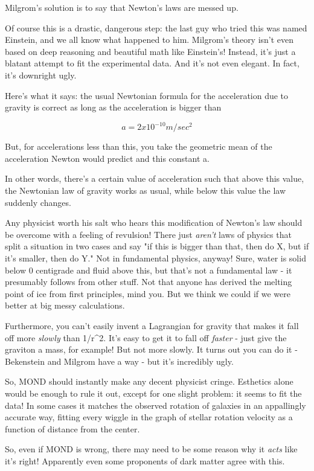 Milgrom's solution is to say that Newton's laws are messed up.

Of course this is a drastic, dangerous step: the last guy who tried this
was named Einstein, and we all know what happened to him.  Milgrom's theory 
isn't even based on deep reasoning and beautiful math like Einstein's!  
Instead, it's just a blatant attempt to fit the experimental data.  
And it's not even elegant.  In fact, it's downright ugly.

Here's what it says: the usual Newtonian formula for the acceleration 
due to gravity is correct as long as the acceleration is bigger than

$$
a = 2 x 10^{-10} m/sec^{2}   
$$
    
But, for accelerations less than this, you take the geometric mean
of the acceleration Newton would predict and this constant a.

In other words, there's a certain value of acceleration such that above
this value, the Newtonian law of gravity works as usual, while below this
value the law suddenly changes.

Any physicist worth his salt who hears this modification of Newton's law
should be overcome with a feeling of revulsion!  There just \emph{aren't} 
laws
of physics that split a situation in two cases and say "if this is bigger
than that, then do X, but if it's smaller, then do Y."  Not in fundamental
physics, anyway!  Sure, water is solid below 0 centigrade and fluid above
this, but that's not a fundamental law - it presumably follows from other 
stuff.  Not that anyone has derived the melting point of ice from first
principles, mind you.  But we think we could if we were better at big
messy calculations.

Furthermore, you can't easily invent a Lagrangian for gravity that makes 
it fall off more \emph{slowly} than 1/r^{2}.  
It's easy to get it to fall off 
\emph{faster} - just give the graviton a mass, for example!  But not more 
slowly.  It turns out you can do it - Bekenstein and Milgrom have a way - 
but it's incredibly ugly. 

So, MOND should instantly make any decent physicist cringe.  Esthetics 
alone would be enough to rule it out, except for one slight problem: it 
seems to fit the data!  In some cases it matches the observed rotation of 
galaxies in an appallingly accurate way, fitting every wiggle in the graph
of stellar rotation velocity as a function of distance from the center.

So, even if MOND is wrong, there may need to be some reason why it 
\emph{acts}
like it's right!  Apparently even some proponents of dark matter agree 
with this.  

